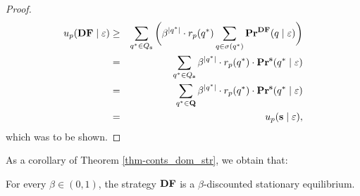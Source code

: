 \begin{proof}
\begin{eqnarray*}
u_p(\text{\rm {\bf DF}} \mid \varepsilon) & \geq & \sum_{q^* \in Q_{\mathbf{s}}} \bigg(\beta^{|q^*|} \cdot  r_p(q^*) \sum_{q \in \sigma(q^*)}  \mathbf{Pr}^{\text{\rm {\bf DF}}}(q \mid \varepsilon)\bigg)\\
& = & \sum_{q^* \in Q_{\mathbf{s}}} \beta^{|q^*|} \cdot  r_p(q^*) \cdot \mathbf{Pr}^{\mathbf{s}}(q^* \mid \varepsilon)\\
& = & \sum_{q^* \in \mathbf{Q}} \beta^{|q^*|} \cdot  r_p(q^*) \cdot \mathbf{Pr}^{\mathbf{s}}(q^* \mid \varepsilon)\\
& = & u_p(\mathbf{s} \mid \varepsilon), 
\end{eqnarray*}
which was to be shown.
\end{proof}
As a corollary of Theorem \ref{thm-conts_dom_str}, we obtain that:
\begin{mycor}\label{cor-conts_equlibria}
For every $\beta \in (0,1)$, the strategy $\text{\rm {\bf DF}}$ is a $\beta$-discounted stationary equilibrium.
\end{mycor} 

